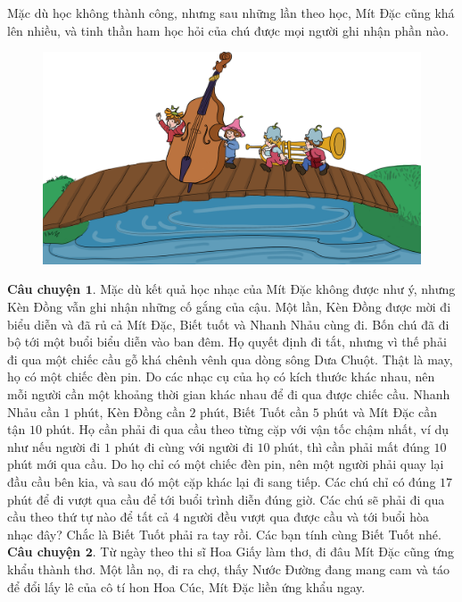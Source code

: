 	Mặc dù học không thành công, nhưng sau những lần theo học, Mít Đặc cũng khá lên nhiều, và tinh thần ham học hỏi của chú được mọi người ghi nhận phần nào.
	\vskip 0.1cm
	\begin{figure}
		\centering
		\vspace*{-15pt}
		\captionsetup{labelformat= empty, justification=centering}
		\includegraphics[width=1\linewidth]{Hinh3_KhiengNhacCu}
		\vspace*{-20pt}
	\end{figure}
	\textbf{\color{toancuabi}Câu chuyện $\pmb{1.}$} Mặc dù kết quả học nhạc của Mít Đặc không được như ý, nhưng Kèn Đồng vẫn ghi nhận những cố gắng của cậu. Một lần, Kèn Đồng được mời đi biểu diễn và đã rủ cả Mít Đặc, Biết tuốt và Nhanh Nhảu cùng đi. Bốn chú đã đi bộ tới một buổi biểu diễn vào ban đêm. Họ quyết định đi tắt, nhưng vì thế phải đi qua một chiếc cầu gỗ khá chênh vênh qua dòng sông Dưa Chuột. Thật là may, họ có một chiếc đèn pin. Do các nhạc cụ của họ có kích thước khác nhau, nên mỗi người cần một khoảng thời gian khác nhau để đi qua được chiếc cầu. Nhanh Nhảu cần $1$ phút, Kèn Đồng cần $2$ phút, Biết Tuốt cần $5$ phút và Mít Đặc cần tận $10$ phút. Họ cần phải đi qua cầu theo từng cặp với vận tốc chậm nhất, ví dụ như nếu người đi $1$ phút đi cùng với người đi $10$ phút, thì cần phải mất đúng $10$ phút mới qua cầu. Do họ chỉ có một chiếc đèn pin, nên một người phải quay lại đầu cầu bên kia, và sau đó một cặp khác lại đi sang tiếp. Các chú chỉ có đúng $17$ phút để đi vượt qua cầu để tới buổi trình diễn đúng giờ. Các chú sẽ phải đi qua cầu theo thứ tự nào để tất cả $4$ người đều vượt qua được cầu và tới buổi hòa nhạc đây? Chắc là Biết Tuốt phải ra tay rồi. Các bạn tính cùng Biết Tuốt nhé.
	\vskip 0.1cm
	\textbf{\color{toancuabi}Câu chuyện $\pmb{2.}$} Từ ngày theo thi sĩ Hoa Giấy làm thơ, đi đâu Mít Đặc cũng ứng khẩu thành thơ. Một lần nọ, đi ra chợ, thấy Nước Đường đang mang cam và táo để đổi lấy lê của cô tí hon Hoa Cúc, Mít Đặc liền ứng khẩu ngay.
